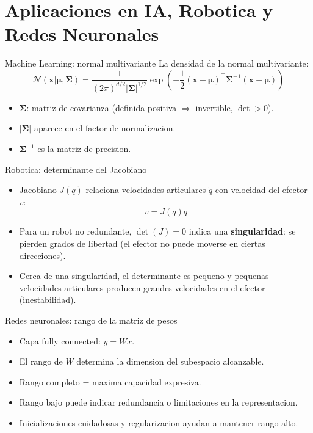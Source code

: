 \documentclass[aspectratio=169, 10pt, xcolor=table]{beamer}
\begin{document}
\section{Aplicaciones en IA, Robotica y Redes Neuronales}

\begin{frame}{Machine Learning: normal multivariante}
    La densidad de la normal multivariante:
    \[
    \mathcal{N}(\mathbf{x}|\boldsymbol{\mu},\boldsymbol{\Sigma}) = \frac{1}{(2\pi)^{d/2}|\boldsymbol{\Sigma}|^{1/2}} \exp\left(-\frac{1}{2}(\mathbf{x}-\boldsymbol{\mu})^\top \boldsymbol{\Sigma}^{-1}(\mathbf{x}-\boldsymbol{\mu})\right)
    \]
    \begin{itemize}
        \item $\boldsymbol{\Sigma}$: matriz de covarianza (definida positiva $\Rightarrow$ invertible, $\det>0$).
        \item $|\boldsymbol{\Sigma}|$ aparece en el factor de normalizacion.
        \item $\boldsymbol{\Sigma}^{-1}$ es la matriz de precision.
    \end{itemize}
\end{frame}

\begin{frame}{Robotica: determinante del Jacobiano}
    \begin{itemize}
        \item Jacobiano $J(q)$ relaciona velocidades articulares $\dot{q}$ con velocidad del efector $v$:
        \[
        v = J(q)\dot{q}
        \]
        \item Para un robot no redundante, $\det(J)=0$ indica una \textbf{singularidad}: se pierden grados de libertad (el efector no puede moverse en ciertas direcciones).
        \item Cerca de una singularidad, el determinante es pequeno y pequenas velocidades articulares producen grandes velocidades en el efector (inestabilidad).
    \end{itemize}
\end{frame}

\begin{frame}{Redes neuronales: rango de la matriz de pesos}
    \begin{itemize}
        \item Capa fully connected: $y = Wx$.
        \item El rango de $W$ determina la dimension del subespacio alcanzable.
        \item Rango completo = maxima capacidad expresiva.
        \item Rango bajo puede indicar redundancia o limitaciones en la representacion.
        \item Inicializaciones cuidadosas y regularizacion ayudan a mantener rango alto.
    \end{itemize}
\end{frame}
\end{document}
